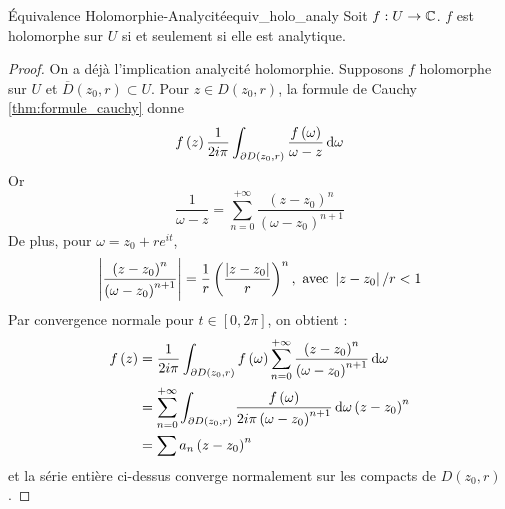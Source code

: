 \documentclass{cours}
\begin{document}
\begin{théorème}{Équivalence Holomorphie-Analycité}{equiv_holo_analy}
    Soit $f : U \to \mathbb{C}$. $f$ est holomorphe sur $U$ si et seulement si elle est analytique.
\end{théorème}
\begin{proof}
    On a déjà l'implication analycité holomorphie. Supposons $f$ holomorphe sur $U$ et $\overline{D}\left(z_{0}, r\right) \subset U$. Pour $z \in D\left(z_{0}, r\right)$, la formule de Cauchy \ref{thm:formule_cauchy} donne 
    \begin{equation*}
        f\left(z\right) \frac{1}{2i\pi}\int_{\partial D\left(z_{0}, r\right)}\frac{f\left(\omega\right)}{\omega - z}{\rm \, d} \omega
    \end{equation*}
    Or 
    \begin{equation*}
        \frac{1}{\omega - z} = \sum_{n = 0}^{+ \infty}\frac{\left(z - z_{0}\right)^{n}}{\left(\omega - z_{0}\right)^{n + 1}}
    \end{equation*}
    De plus, pour $\omega = z_{0} + re^{it}$,
    \begin{equation*}
        \left|\frac{\left(z - z_{0}\right)^{n}}{\left(\omega - z_{0}\right)^{n + 1}}\right| = \frac{1}{r}\left(\frac{\left|z - z_{0}\right|}{r}\right)^{n}, \text{ avec } \left|z - z_{0}\right|/r < 1
    \end{equation*}
    Par convergence normale pour $t \in \left[0, 2\pi\right]$, on obtient :
    \begin{equation*}
        \begin{aligned}
            f\left(z\right) &= \frac{1}{2i\pi}\int_{\partial D\left(z_{0},r \right)}f\left(\omega\right)\sum_{n = 0}^{+ \infty}\frac{\left(z - z_{0}\right)^{n}}{\left(\omega - z_{0}\right)^{n + 1}}{\rm \, d} \omega \\ &= \sum_{n = 0}^{+ \infty}\int_{\partial D\left(z_{0}, r\right)}\frac{f\left(\omega\right)}{2i\pi\left(\omega - z_{0}\right)^{n + 1}}{\rm \, d} \omega\left(z - z_{0}\right)^{n} \\ &= \sum a_{n}\left(z - z_{0}\right)^{n}
        \end{aligned}
    \end{equation*}
    et la série entière ci-dessus converge normalement sur les compacts de $D\left(z_{0}, r\right)$.
\end{proof}
\end{document}
